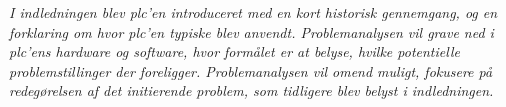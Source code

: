\textit{I indledningen blev \gls{plc}'en introduceret med en kort historisk gennemgang, og en forklaring om hvor \gls{plc}'en typiske blev anvendt. Problemanalysen vil grave ned i \gls{plc}'ens hardware og software, hvor formålet er at belyse, hvilke potentielle problemstillinger der foreligger. Problemanalysen vil omend muligt, fokusere på redegørelsen af det initierende problem, som tidligere blev belyst i indledningen.}


